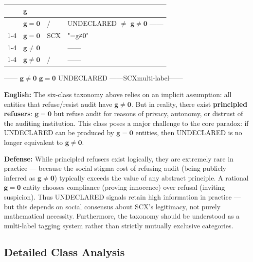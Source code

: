 \documentclass[12pt,a4paper]{article}
\theoremstyle{remark}
\newcommand{\g}{\mathbf{g}}
\begin{document}
\begin{table}[H]
\centering
\caption{}
\label{tab:missing_classes}
\begin{tabular}{p{} p{} p{} p{}}
\toprule
\textbf{} & \textbf{g} & \textbf{} & \textbf{} \\
\midrule
 & $ \g = \mathbf{0} $ & / & UNDECLARED $ \neq $ $ \g \neq \mathbf{0} $ —— \\
\cmidrule{1-4}
 & $ \g = \mathbf{0} $ & SCX & "=g≠0" \\
\cmidrule{1-4}
 & $ \g \neq \mathbf{0} $ &  & —— \\
\cmidrule{1-4}
 & $ \g \neq \mathbf{0} $ & / & —— \\
\bottomrule
\end{tabular}
\end{table}

\textbf{} —— $ \g \neq \mathbf{0} $ $ \g = \mathbf{0} $  UNDECLARED ——SCXmulti-label——

\vspace{6pt}
\noindent
\textbf{English:} The six-class taxonomy above relies on an implicit assumption: all entities that refuse/resist audit have $ \g \neq \mathbf{0} $. But in reality, there exist \textbf{principled refusers}: $ \g = \mathbf{0} $ but refuse audit for reasons of privacy, autonomy, or distrust of the auditing institution. This class poses a major challenge to the core paradox: if UNDECLARED can be produced by $ \g = \mathbf{0} $ entities, then UNDECLARED is no longer equivalent to $ \g \neq \mathbf{0} $.

\textbf{Defense:} While principled refusers exist logically, they are extremely rare in practice — because the social stigma cost of refusing audit (being publicly inferred as $ \g \neq \mathbf{0} $) typically exceeds the value of any abstract principle. A rational $ \g = \mathbf{0} $ entity chooses compliance (proving innocence) over refusal (inviting suspicion). Thus UNDECLARED signals retain high information in practice — but this depends on social consensus about SCX's legitimacy, not purely mathematical necessity. Furthermore, the taxonomy should be understood as a multi-label tagging system rather than strictly mutually exclusive categories.

\subsection{}
\subsection{Detailed Class Analysis}
\end{document}
